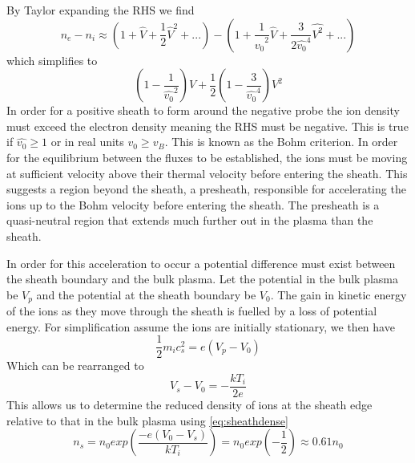 \documentclass[12pt]{article}
\def\be{\begin{equation}}
\def\ee{\end{equation}}
\begin{document}
By Taylor expanding the RHS we find 
\be 
n_e - n_i \approx (1 + \hat{V} + \frac{1}{2} \hat{V}^2 + ...) - (1 + \frac{1}{\hat{v_0}^2} \hat{V} + \frac{3}{2 \hat{v_0}^4} \hat{V^2} + ...)
\ee
which simplifies to
\be 
\left(1 - \frac{1}{\hat{v_0}^2}\right) V + \frac{1}{2}\left(1 - \frac{3}{\hat{v_0}^4} \right) V^2 
\ee
In order for a positive sheath to form around the negative probe the ion density must exceed the electron density meaning the RHS must be negative. This is true if $\hat{v_0}\ge 1$ or in real units $v_0 \ge v_B$. This is known as the Bohm criterion. In order for the equilibrium between the fluxes to be established, the ions must be moving at sufficient velocity above their thermal velocity before entering the sheath. This suggests a region beyond the sheath, a presheath, responsible for accelerating the ions up to the Bohm velocity before entering the sheath. The presheath is a quasi-neutral region that extends much further out in the plasma than the sheath. 

In order for this acceleration to occur a potential difference must exist between the sheath boundary and the bulk plasma. Let the potential in the bulk plasma be $V_{p}$ and the potential at the sheath boundary be $V_0$. The gain in kinetic energy of the ions as they move through the sheath is fuelled by a loss of potential energy. For simplification assume the ions are initially stationary, we then have 
\be
\frac{1}{2} m_i c_s^2 = e (V_{p} - V_0) 
\ee
Which can be rearranged to 
\be 
V_{s} - V_0 = -\frac{k T_i}{2 e}
\ee 
This allows us to determine the reduced density of ions at the sheath edge relative to that in the bulk plasma using \eqref{eq:sheathdense}
\be 
n_s = n_0 exp \left( \frac{-e(V_0 - V_s)}{k T_i}\right) = n_0 exp\left(-\frac{1}{2}\right) \approx 0.61 n_0
\label{eq:presheathdrop}
\ee
\end{document}
